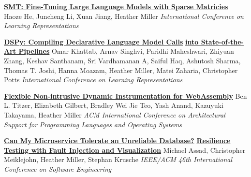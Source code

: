 \documentclass[9pt]{article}
\begin{document}
\bigskip

\noindent\href{https://openreview.net/forum?id=GbgCRJedQ7}{\bf SMT: Fine-Tuning Large Language Models with Sparse Matricies}\vspace{-0.03in}
\newline\noindent Haoze He, Juncheng Li, Xuan Jiang, Heather Miller
\newline\noindent\emph{International Conference on Learning Representations}
\bigskip

\noindent\href{https://openreview.net/forum?id=sY5N0zY5Od}{\bf DSPy: Compiling Declarative Language Model Calls}\vspace{-0.03in}
\newline\noindent\href{https://openreview.net/forum?id=sY5N0zY5Od}{\bf into State-of-the-Art Pipelines}
\newline\noindent Omar Khattab, Arnav Singhvi, Paridhi Maheshwari, Zhiyuan Zhang,\vspace{-0.03in} 
\newline\noindent Keshav Santhanam, Sri Vardhamanan A, Saiful Haq, Ashutosh Sharma,\vspace{-0.03in} 
\newline\noindent Thomas T. Joshi, Hanna Moazam, Heather Miller, Matei Zaharia, Christopher Potts
\newline\noindent\emph{International Conference on Learning Representations}
\bigskip

\noindent\href{https://dl.acm.org/doi/10.1145/3620666.3651338}{\bf Flexible Non-intrusive Dynamic Instrumentation for WebAssembly}
\newline\noindent Ben L. Titzer, Elizabeth Gilbert, Bradley Wei Jie Teo, Yash Anand,\vspace{-0.03in}
\newline\noindent Kazuyuki Takayama, Heather Miller
\newline\noindent\emph{ACM International Conference on Architectural Support for}\vspace{-0.03in} 
\newline\noindent\emph{Programming Languages and Operating Systems}
\bigskip

\noindent\href{https://dl.acm.org/doi/10.1145/3639478.3640021}{\bf Can My Microservice Tolerate an Unreliable Database?}\vspace{-0.03in}
\newline\noindent\href{https://dl.acm.org/doi/10.1145/3639478.3640021}{\bf Resilience Testing with Fault Injection and Visualization}
\newline\noindent Michael Assad, Christopher Meiklejohn, Heather Miller, Stephan Krusche
\newline\noindent\emph{IEEE/ACM 46th International Conference on Software Engineering}
\bigskip
\end{document}
